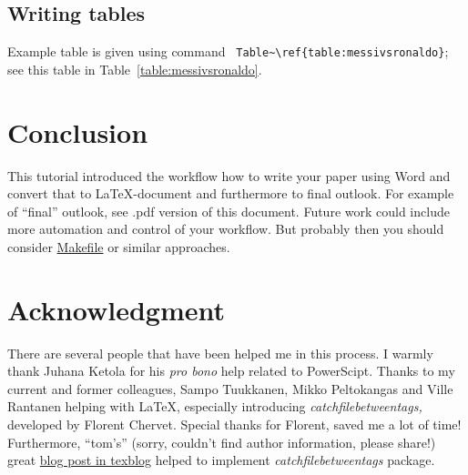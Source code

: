\subsection{Writing tables}

Example table is given using command \verb| Table~\ref{table:messivsronaldo}|; see this table in
Table~\ref{table:messivsronaldo}.


\section{Conclusion}

This tutorial introduced the workflow how to write your paper using Word and convert that to \LaTeX{}-document and
furthermore to final outlook. For example of ``final'' outlook, see .pdf version of this document. Future work could
include more automation and control of your workflow. But probably then you should consider
\href{https://en.wikipedia.org/wiki/Makefile}{Makefile} or similar approaches.

\section*{Acknowledgment}

There are several people that have been helped me in this process. I warmly thank Juhana Ketola for his \emph{pro bono}
help related to PowerScipt. Thanks to my current and former colleagues, Sampo Tuukkanen, Mikko Peltokangas and Ville
Rantanen helping with \LaTeX{}, especially introducing \emph{catchfilebetweentags,} developed by Florent Chervet.
Special thanks for Florent, saved me a lot of time! Furthermore, ``tom's'' (sorry, couldn't find author information,
please share!) great
\href{ https://texblog.org/2012/12/04/keeping-things-organized-in-large-documents/}{blog post in texblog} helped to
implement \emph{catchfilebetweentags} package.
